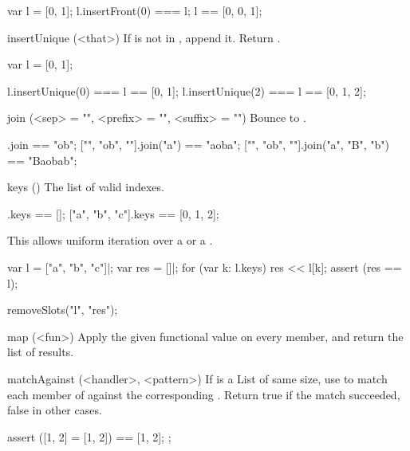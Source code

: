 \begin{urbiscriptapi}
\begin{urbiassert}
var l = [0, 1];
l.insertFront(0) === l;
l == [0, 0, 1];
\end{urbiassert}


\item[insertUnique](<that>)%
  If \that is not in \this, append it. Return \this.

\begin{urbiassert}
var l = [0, 1];

l.insertUnique(0) === l == [0, 1];
l.insertUnique(2) === l == [0, 1, 2];
\end{urbiassert}


\item[join](<sep> = "", <prefix> = "", <suffix> = "")%
  Bounce to .

\begin{urbiassert}
["", "ob", ""].join                == "ob";
["", "ob", ""].join("a")           == "aoba";
["", "ob", ""].join("a", "B", "b") == "Baobab";
\end{urbiassert}


\item[keys]()%
  The list of valid indexes.
\begin{urbiassert}
[].keys == [];
["a", "b", "c"].keys == [0, 1, 2];
\end{urbiassert}

This allows uniform iteration over a  or a
.

\begin{urbiscript}
var l = ["a", "b", "c"]|;
var res = []|;
for (var k: l.keys)
  res << l[k];
assert (res == l);
\end{urbiscript}
\begin{urbicomment}
removeSlots("l", "res");
\end{urbicomment}


\item[map](<fun>)%
  Apply the given functional value on every member, and return the list of
  results.



\item[matchAgainst](<handler>, <pattern>)%
  If  is a List of same size, use  to match each
  member of \this against the corresponding .  Return true if
  the match succeeded, false in other cases.
\begin{urbiscript}
assert
{
  ([1, 2] = [1, 2]) == [1, 2];
};


\end{urbiscript}
\end{urbiscriptapi}
